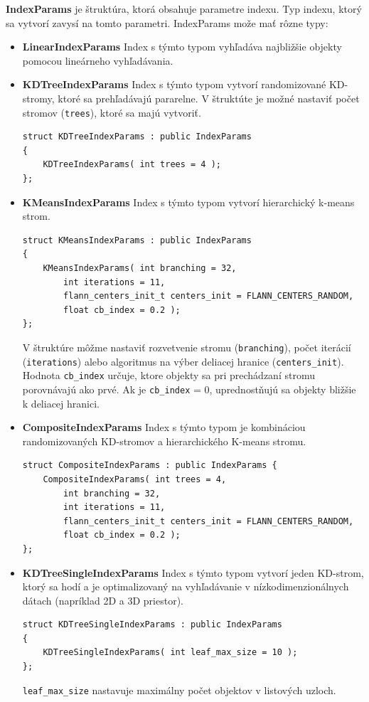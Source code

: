 \documentclass[12pt,oneside]{fithesis2}
\begin{document}
\textbf{IndexParams} je štruktúra, ktorá obsahuje parametre indexu. Typ indexu, ktorý sa vytvorí zavysí na tomto parametri. IndexParams može mať rôzne typy:
\begin{itemize}

\item \textbf{LinearIndexParams} Index s týmto typom vyhľadáva najbližšie objekty pomocou lineárneho vyhľadávania. \cite{manual}

\item \textbf{KDTreeIndexParams} Index s týmto typom vytvorí randomizované KD-stromy, ktoré sa prehľadávajú pararelne. V štruktúte je možné nastaviť počet stromov (\texttt{trees}), ktoré sa majú vytvoriť. \cite{manual}
{\scriptsize
\begin{lstlisting}
struct KDTreeIndexParams : public IndexParams
{
	KDTreeIndexParams( int trees = 4 );
};
\end{lstlisting}}
\item \textbf{KMeansIndexParams} Index s týmto typom vytvorí hierarchický k-means strom.
{\scriptsize
\begin{lstlisting}
struct KMeansIndexParams : public IndexParams
{
	KMeansIndexParams( int branching = 32,
		int iterations = 11,
		flann_centers_init_t centers_init = FLANN_CENTERS_RANDOM,
		float cb_index = 0.2 );
};
\end{lstlisting}}
V štruktúre môžme nastaviť rozvetvenie stromu (\texttt{branching}), počet iterácií (\texttt{iterations}) alebo algoritmus na výber deliacej hranice (\texttt{centers\_init}). Hodnota \texttt{cb\_index} určuje, ktore objekty sa pri prechádzaní stromu porovnávajú ako prvé. Ak je \texttt{cb\_index} = 0, uprednostňujú sa objekty bližšie k deliacej hranici. \cite{manual}

\item \textbf{CompositeIndexParams} Index s týmto typom je kombináciou randomizovaných KD-stromov a hierarchického K-means stromu. \cite{manual}
{\scriptsize
\begin{lstlisting}
struct CompositeIndexParams : public IndexParams {
	CompositeIndexParams( int trees = 4,
		int branching = 32,
		int iterations = 11,
		flann_centers_init_t centers_init = FLANN_CENTERS_RANDOM,
		float cb_index = 0.2 );
};
\end{lstlisting}} 

\item \textbf{KDTreeSingleIndexParams} Index s týmto typom vytvorí jeden KD-strom, ktorý sa hodí a je optimalizovaný na vyhľadávanie v nízkodimenzionálnych dátach (napríklad 2D a 3D priestor).
{\scriptsize
\begin{lstlisting}
struct KDTreeSingleIndexParams : public IndexParams
{
	KDTreeSingleIndexParams( int leaf_max_size = 10 );
};
\end{lstlisting}}
\texttt{leaf\_max\_size} nastavuje maximálny počet objektov v listových uzloch. \cite{manual}


\end{itemize}
\end{document}
